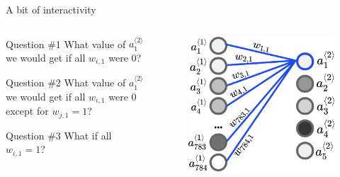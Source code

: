 \documentclass{beamer}
\begin{document}
    \begin{frame}{A bit of interactivity}
    \begin{columns}
        \begin{column}{0.5\textwidth}
            \begin{exampleblock}{Question \#1}
                What value of $a_1^{\langle 2 \rangle}$ we would get if all $w_{i,1}$ were $0$?
            \end{exampleblock}
            \begin{exampleblock}{Question \#2}
                What value of $a_1^{\langle 2 \rangle}$ we would get if all $w_{i,1}$ were $0$ except for $w_{j,1}=1$?
            \end{exampleblock}
            \begin{exampleblock}{Question \#3}
                What if all $w_{i,1}=1$?
            \end{exampleblock}
        \end{column}
        \begin{column}{0.5\textwidth}
            \begin{figure}
            \centering
                \includegraphics[width=\textwidth]{images/presentation/layer_all_selected.png}
            \end{figure}
        \end{column}
    \end{columns}
    \end{frame}
\end{document}

